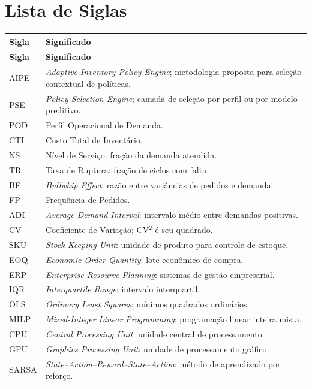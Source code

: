 \chapter*{Lista de Siglas}
\begingroup\small
\begin{longtable}{@{}p{3cm}p{11.5cm}@{}}
\toprule
\textbf{Sigla} & \textbf{Significado}\\
\midrule\endfirsthead
\toprule\textbf{Sigla} & \textbf{Significado}\\\midrule\endhead
AIPE & \textit{Adaptive Inventory Policy Engine}; metodologia proposta para seleção contextual de políticas.\\
PSE & \textit{Policy Selection Engine}; camada de seleção por perfil ou por modelo preditivo.\\
POD & Perfil Operacional de Demanda.\\
CTI & Custo Total de Inventário.\\
NS & Nível de Serviço: fração da demanda atendida.\\
TR & Taxa de Ruptura: fração de ciclos com falta.\\
BE & \textit{Bullwhip Effect}: razão entre variâncias de pedidos e demanda.\\
FP & Frequência de Pedidos.\\
ADI & \textit{Average Demand Interval}: intervalo médio entre demandas positivas.\\
CV & Coeficiente de Variação; CV$^2$ é seu quadrado.\\
SKU & \textit{Stock Keeping Unit}: unidade de produto para controle de estoque.\\
EOQ & \textit{Economic Order Quantity}: lote econômico de compra.\\
ERP & \textit{Enterprise Resource Planning}: sistemas de gestão empresarial.\\
IQR & \textit{Interquartile Range}: intervalo interquartil.\\
OLS & \textit{Ordinary Least Squares}: mínimos quadrados ordinários.\\
MILP & \textit{Mixed-Integer Linear Programming}: programação linear inteira mista.\\
CPU & \textit{Central Processing Unit}: unidade central de processamento.\\
GPU & \textit{Graphics Processing Unit}: unidade de processamento gráfico.\\
SARSA & \textit{State--Action--Reward--State--Action}: método de aprendizado por reforço.\\

\end{longtable}
